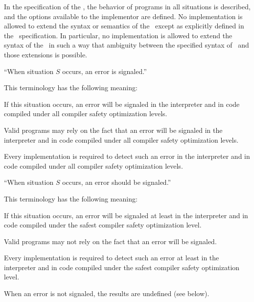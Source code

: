 In the specification of the \CLOS, the behavior of programs in all situations
is described, and the options available to the implementor are defined. No
implementation is allowed to extend the syntax or semantics of the \OS\ except
as explicitly defined in the \OS\ specification. In particular, no
implementation is allowed to extend the syntax of the \OS\ in such a way that
ambiguity between the specified syntax of \OS\ and those extensions is
possible.

``When situation $S$ occurs, an error is signaled.''

This terminology has the following meaning:

\beginlist

\item{\bull} If this situation occurs, an error will be signaled in
the interpreter and in code compiled under all compiler safety
optimization levels.

\item{\bull} Valid programs may rely on the fact that an error will be
signaled in the interpreter and in code compiled under all compiler
safety optimization levels.

\item{\bull} Every implementation is required to detect such an error
in the interpreter and in code compiled under all compiler safety
optimization levels.

\endlist

``When situation $S$ occurs, an error should be signaled.''

This terminology has the following meaning:

\beginlist

\item{\bull} If this situation occurs, an error will be signaled at
least in the interpreter and in code compiled under the safest
compiler safety optimization level.

\item{\bull} Valid programs may not rely on the fact that an error will be
signaled.

\item{\bull} Every implementation is required to detect such an error
at least in the interpreter and in code compiled under the safest
compiler safety optimization level.

\item{\bull} When an error is not signaled, the results are undefined (see
below).

\endlist

